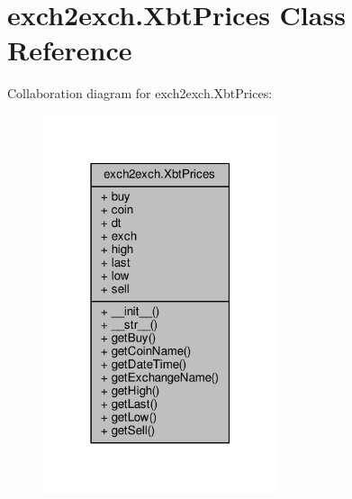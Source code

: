 \hypertarget{classexch2exch_1_1_xbt_prices}{}\section{exch2exch.\+Xbt\+Prices Class Reference}
\label{classexch2exch_1_1_xbt_prices}


Collaboration diagram for exch2exch.\+Xbt\+Prices\+:\nopagebreak
\begin{figure}[H]
\begin{center}
\leavevmode
\includegraphics[width=195pt]{classexch2exch_1_1_xbt_prices__coll__graph}
\end{center}
\end{figure}
